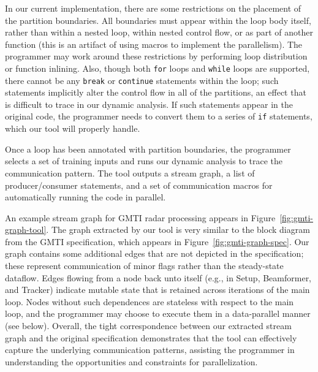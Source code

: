 In our current implementation, there are some restrictions on the
placement of the partition boundaries.  All boundaries must appear
within the loop body itself, rather than within a nested loop, within
nested control flow, or as part of another function (this is an
artifact of using macros to implement the parallelism).  The
programmer may work around these restrictions by performing loop
distribution or function inlining.  Also, though both {\tt for} loops
and {\tt while} loops are supported, there cannot be any {\tt break}
or {\tt continue} statements within the loop; such statements
implicitly alter the control flow in all of the partitions, an effect
that is difficult to trace in our dynamic analysis.  If such
statements appear in the original code, the programmer needs to
convert them to a series of {\tt if} statements, which our tool will
properly handle.

Once a loop has been annotated with partition boundaries, the
programmer selects a set of training inputs and runs our dynamic
analysis to trace the communication pattern.  The tool outputs a
stream graph, a list of producer/consumer statements, and a set of
communication macros for automatically running the code in parallel.

An example stream graph for GMTI radar processing appears in
Figure~\ref{fig:gmti-graph-tool}.  The graph extracted by our tool is
very similar to the block diagram from the GMTI specification, which
appears in Figure~\ref{fig:gmti-graph-spec}.  Our graph contains some
additional edges that are not depicted in the specification; these
represent communication of minor flags rather than the steady-state
dataflow.  Edges flowing from a node back unto itself (e.g., in Setup,
Beamformer, and Tracker) indicate mutable state that is retained
across iterations of the main loop.  Nodes without such dependences
are stateless with respect to the main loop, and the programmer may
choose to execute them in a data-parallel manner (see below).
Overall, the tight correspondence between our extracted stream graph
and the original specification demonstrates that the tool can
effectively capture the underlying communication patterns, assisting
the programmer in understanding the opportunities and constraints for
parallelization.

